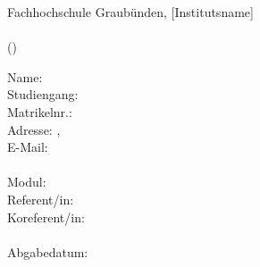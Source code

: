 \begin{titlepage}
    
    \begin{center}
        Fachhochschule Graubünden, [Institutsname] \\
        \vspace{30mm}
        \huge\textbf{\haupttitel}\\
        \hfill \break
        \large{(\untertitel)}
    \end{center}
    
    \vfill
    
    \begin{flushleft}
    Name: \autorenschaft\\
    Studiengang: \studiengang\\
    Matrikelnr.: \matrikelnummer\\
    Adresse: \adresse, \plz~\ort\\
    E-Mail: \email\\
    ~\\
    Modul: \modul\\
    Referent/in: \\
    Koreferent/in: \coRefe\\
    ~\\
    Abgabedatum: \abgabedatum
    \end{flushleft}
    
    \vspace{20mm}
    
\end{titlepage}
